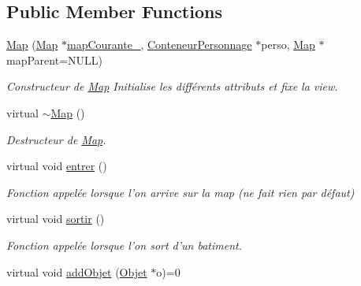 \subsection*{Public Member Functions}
\begin{DoxyCompactItemize}
\item 
\hyperlink{classMap_a3b787a14ea0702189fc7003669b7748d}{Map} (\hyperlink{classMap}{Map} $\ast$\hyperlink{classMap_a49f53be912ed1a0ad856bfaede835ca7}{map\-Courante\-\_\-}, \hyperlink{classConteneurPersonnage}{Conteneur\-Personnage} $\ast$perso, \hyperlink{classMap}{Map} $\ast$map\-Parent=N\-U\-L\-L)
\begin{DoxyCompactList}\small\item\em Constructeur de \hyperlink{classMap}{Map} Initialise les différents attributs et fixe la view. \end{DoxyCompactList}\item 
\hypertarget{classMap_aa403fbe09394ccf39747588f5168e3b2}{virtual \hyperlink{classMap_aa403fbe09394ccf39747588f5168e3b2}{$\sim$\-Map} ()}\label{classMap_aa403fbe09394ccf39747588f5168e3b2}

\begin{DoxyCompactList}\small\item\em Destructeur de \hyperlink{classMap}{Map}. \end{DoxyCompactList}\item 
\hypertarget{classMap_a8bdff7bdbdd14bd4add0d282f51f35e0}{virtual void \hyperlink{classMap_a8bdff7bdbdd14bd4add0d282f51f35e0}{entrer} ()}\label{classMap_a8bdff7bdbdd14bd4add0d282f51f35e0}

\begin{DoxyCompactList}\small\item\em Fonction appelée lorsque l'on arrive sur la map (ne fait rien par défaut) \end{DoxyCompactList}\item 
\hypertarget{classMap_a483d996c2d56cf7af870bde2a63423dc}{virtual void \hyperlink{classMap_a483d996c2d56cf7af870bde2a63423dc}{sortir} ()}\label{classMap_a483d996c2d56cf7af870bde2a63423dc}

\begin{DoxyCompactList}\small\item\em Fonction appelée lorsque l'on sort d'un batiment. \end{DoxyCompactList}\item 
\hypertarget{classMap_aa915b4b184fd8e610f1406758d719eb3}{virtual void \hyperlink{classMap_aa915b4b184fd8e610f1406758d719eb3}{add\-Objet} (\hyperlink{classObjet}{Objet} $\ast$o)=0}\label{classMap_aa915b4b184fd8e610f1406758d719eb3}


\end{DoxyCompactItemize}
